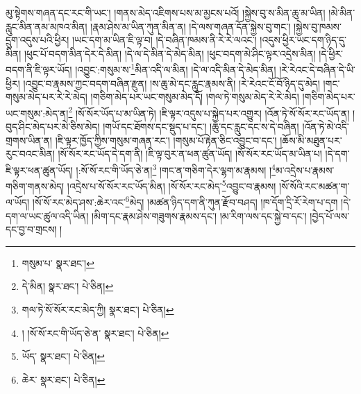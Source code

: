 མུ་སྟེགས་གཞན་དང་རང་གི་ཡང་། །གནས་མེད་འཇིགས་པས་མ་མྱངས་པའོ། །སྐྱེས་བུ་ས་མིན་ཆུ་མ་ཡིན། །མེ་མིན་རླུང་མིན་ནམ་མཁའ་མིན། །རྣམ་ཤེས་མ་ཡིན་ཀུན་མིན་ན། །དེ་ལས་གཞན་དོན་སྐྱེས་བུ་གང་། །སྐྱེས་བུ་ཁམས་དྲུག་འདུས་པའི་ཕྱིར། །ཡང་དག་མ་ཡིན་ཇི་ལྟ་བ། །དེ་བཞིན་ཁམས་ནི་རེ་རེ་ལའང་། །འདུས་ཕྱིར་ཡང་དག་ཉིད་དུ་མིན། །ཕུང་པོ་བདག་མིན་དེར་དེ་མིན། །དེ་ལ་དེ་མིན་དེ་མེད་མིན། །ཕུང་བདག་མེ་ཤིང་ལྟར་འདྲེས་མིན། །དེ་ཕྱིར་བདག་ནི་ཇི་ལྟར་ཡོད། །འབྱུང་:གསུམ་ས་\footnote{གསུམ་པ་  སྣར་ཐང་། }མིན་འདི་ལ་མིན། །དེ་ལ་འདི་མིན་དེ་མེད་མིན། །རེ་རེའང་དེ་བཞིན་དེ་ཡི་ཕྱིར། །འབྱུང་བ་རྣམས་ཀྱང་བདག་བཞིན་རྫུན། །ས་ཆུ་མེ་དང་རླུང་རྣམས་ནི། །རེ་རེའང་ངོ་བོ་ཉིད་དུ་མེད། །གང་གསུམ་མེད་པར་རེ་རེ་མེད། །གཅིག་མེད་པར་ཡང་གསུམ་མེད་དོ། །གལ་ཏེ་གསུམ་མེད་རེ་རེ་མེད། །གཅིག་མེད་པར་ཡང་གསུམ་:མེད་ན།\footnote{དེ་མིན།  སྣར་ཐང་།  པེ་ཅིན། } །སོ་སོར་ཡོད་པ་མ་ཡིན་ཏེ། །ཇི་ལྟར་འདུས་པ་སྐྱེད་པར་འགྱུར། །འོན་ཏེ་སོ་སོར་རང་ཡོད་ན། །བུད་ཤིང་མེད་པར་མེ་ཅིས་མེད། །གཡོ་དང་ཐོགས་དང་སྡུད་པ་དང་། །ཆུ་དང་རླུང་དང་ས་དེ་བཞིན། །འོན་ཏེ་མེ་འདི་གྲགས་ཡིན་ན། །ཇི་ལྟར་ཁྱོད་ཀྱིས་གསུམ་གཞན་རང་། །གསུམ་པོ་རྟེན་ཅིང་འབྱུང་བ་དང་། །ཆོས་མི་མཐུན་པར་རུང་བའང་མིན། །སོ་སོར་རང་ཡོད་དེ་དག་ནི། །ཇི་ལྟ་བུར་ན་ཕན་ཚུན་ཡོད། །སོ་སོར་རང་ཡོད་མ་ཡིན་པ། །དེ་དག་ཇི་ལྟར་ཕན་ཚུན་ཡོད། །:སོ་སོ་རང་གི་ཡོད་ཅེ་ན།\footnote{གལ་ཏེ་སོ་སོར་རང་མེད་ཀྱི།  སྣར་ཐང་།  པེ་ཅིན། } །གང་ན་གཅིག་དེར་ལྷག་མ་རྣམས། །\footnote{། །སོ་སོ་རང་གི་ཡོད་ཅེ་ན་  སྣར་ཐང་།  པེ་ཅིན། }མ་འདྲེས་པ་རྣམས་གཅིག་གནས་མེད། །འདྲེས་པ་སོ་སོར་རང་ཡོད་མིན། །སོ་སོར་རང་མེད་\footnote{ཡོད་  སྣར་ཐང་།  པེ་ཅིན། }འབྱུང་བ་རྣམས། །སོ་སོའི་རང་མཚན་ག་ལ་ཡོད། །སོ་སོ་རང་མེད་ཤས་:ཆེར་འང་\footnote{ཆེར་  སྣར་ཐང་།  པེ་ཅིན། }མེད། །མཚན་ཉིད་དག་ནི་ཀུན་རྫོབ་བཤད། །ཁ་དོག་དྲི་རོ་རེག་པ་དག །དེ་དག་ལ་ཡང་ཚུལ་འདི་ཡིན། །མིག་དང་རྣམ་ཤེས་གཟུགས་རྣམས་དང་། །མ་རིག་ལས་དང་སྐྱེ་བ་དང་། །བྱེད་པོ་ལས་དང་བྱ་བ་གྲངས། །
